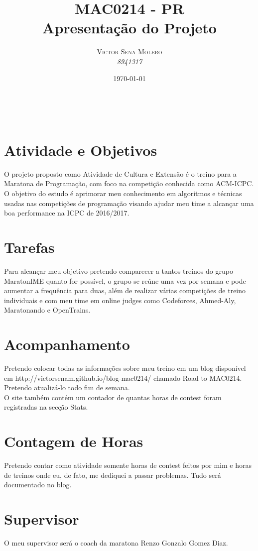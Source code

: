 \documentclass[a4paper, 11pt]{article} %
\title{\textbf{MAC0214 - PR}\\ %
Apresentação do Projeto} %
\author{\textsc{Victor Sena Molero} %
\\{\textit{8941317}}} %
\date{\today} %
\makeatletter
\renewcommand{\maketitle}{ %
\begin{flushright} %
{\LARGE\@title} %

\vspace{50pt} %

{\large\@author} %
\\\@date %

\vspace{40pt} %
\end{flushright}
}
\makeatother
\begin{document}
\maketitle %


\section*{Atividade e Objetivos}

O projeto proposto como Atividade de Cultura e Extensão é o treino para a Maratona de Programação, com foco na competição conhecida como ACM-ICPC. O objetivo do estudo é aprimorar meu conhecimento em algoritmos e técnicas usadas nas competições de programação visando ajudar meu time a alcançar uma boa performance na ICPC de 2016/2017.


\section*{Tarefas}

Para alcançar meu objetivo pretendo comparecer a tantos treinos do grupo MaratonIME quanto for possível, o grupo se reúne uma vez por semana e pode aumentar a frequência para duas, além de realizar várias competições de treino individuais e com meu time em online judges como Codeforces, Ahmed-Aly, Maratonando e OpenTrains.


\section*{Acompanhamento}

Pretendo colocar todas as informações sobre meu treino em um blog disponível em http://victorsenam.github.io/blog-mac0214/ chamado Road to MAC0214. Pretendo atualizá-lo todo fim de semana. \\
O site também contém um contador de quantas horas de contest foram registradas na secção Stats.

\section*{Contagem de Horas}
Pretendo contar como atividade somente horas de contest feitos por mim e horas de treinos onde eu, de fato, me dediquei a passar problemas. Tudo será documentado no blog. \\

\section*{Supervisor}
O meu supervisor será o coach da maratona Renzo Gonzalo Gomez Diaz.

\end{document}
